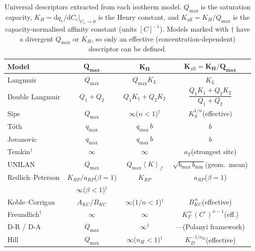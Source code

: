	\begin{table}[htbp]
		\centering
		\small
		\caption{Universal descriptors extracted from each isotherm
			model.  $Q_{\max}$ is the saturation capacity,
			$K_H = \mathrm{d}q_e/\mathrm{d}C_e|_{C_e\to 0}$ is the
			Henry constant, and
			$K_{\mathrm{aff}} = K_H / Q_{\max}$ is the
			capacity-normalised affinity constant (units $[C]^{-1}$).
			Models marked with $\dagger$ have a divergent $Q_{\max}$
			or $K_H$, so only an effective (concentration-dependent)
			descriptor can be defined.}
		\label{tab:universal_descriptors}
		\renewcommand{\arraystretch}{1.4}
		\begin{tabular}{lccc}
			\hline
			\textbf{Model}
			& $\boldsymbol{Q_{\max}}$
			& $\boldsymbol{K_H}$
			& $\boldsymbol{K_{\mathrm{aff}} = K_H/Q_{\max}}$
			\\
			\hline
			Langmuir
			& $Q_{\max}$
			& $Q_{\max} K_L$
			& $K_L$
			\\
			Double Langmuir
			& $Q_1 + Q_2$
			& $Q_1 K_1 + Q_2 K_2$
			& $\dfrac{Q_1 K_1 + Q_2 K_2}{Q_1 + Q_2}$
			\\[4pt]
			Sips
			& $Q_{\max}$
			& $\infty$\;($n<1$)$^{\dagger}$
			& $K_S^{1/n}$\;(effective)
			\\
			T\'oth
			& $q_{\max}$
			& $q_{\max}\,b$
			& $b$
			\\
			Jovanovic
			& $q_{\max}$
			& $q_{\max}\,b$
			& $b$
			\\
			Temkin$^{\dagger}$
			& $\infty$
			& $\infty$
			& $a_T$\;(strongest site)
			\\
			UNILAN
			& $Q_{\max}$
			& $Q_{\max}\!\left\langle K \right\rangle_{\!f}$
			& $\sqrt{b_{\max}\,b_{\min}}$\;(geom.\ mean)
			\\
			Redlich--Peterson
			& $K_{RP}/a_{RP}$\;($\beta\!=\!1$)
			& $K_{RP}$
			& $a_{RP}$\;($\beta\!=\!1$)
			\\
			& $\infty$\;($\beta\!<\!1$)$^{\dagger}$
			&
			&
			\\
			Koble--Corrigan
			& $A_{KC}/B_{KC}$
			& $\infty$\;($1/n<1$)$^{\dagger}$
			& $B_{KC}^{\,n}$\;(effective)
			\\
			Freundlich$^{\dagger}$
			& $\infty$
			& $\infty$
			& $K_F^{\,n}\,(C^\circ)^{n-1}$\;(eff.)
			\\
			D-R / D-A
			& $Q_{\max}$
			& $\infty^{\dagger}$
			& ---\;(Polanyi framework)
			\\
			Hill
			& $Q_{\max}$
			& $\infty$\;($n_H\!<\!1$)$^{\dagger}$
			& $K_D^{-1/n_H}$\;(effective)
			\\
			\hline
		\end{tabular}
	\end{table}

